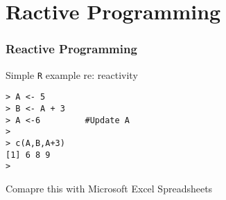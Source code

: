 \documentclass{beamer}
\begin{document}
\section{Ractive Programming}
\begin{frame}[fragile]
\Large
\frametitle{Reactive Programming}

Simple \texttt{R} example re: reactivity
\begin{framed}
\begin{verbatim}
> A <- 5
> B <- A + 3
> A <-6         #Update A
>
> c(A,B,A+3)
[1] 6 8 9
>
\end{verbatim}
\end{framed}
Comapre this with Microsoft Excel Spreadsheets
\end{frame}
\end{document}
